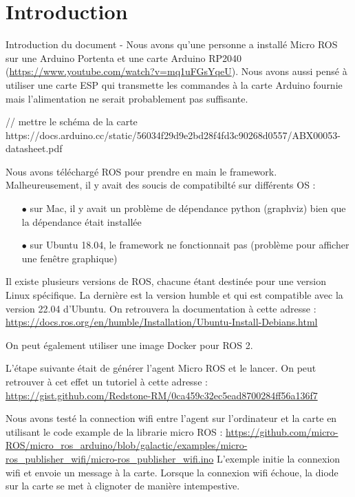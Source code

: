 	\chapter{Introduction}

Introduction du document - 	Nous avons qu'une personne a installé Micro ROS sur une Arduino Portenta et une carte Arduino RP2040 (\url{https://www.youtube.com/watch?v=mq1uFGsYqeU}).
Nous avons aussi pensé à utiliser une carte ESP qui transmette les commandes à la carte Arduino fournie mais l'alimentation ne serait probablement pas suffisante.

// mettre le schéma de la carte
https://docs.arduino.cc/static/56034f29d9e2bd28f4fd3c90268d0557/ABX00053-datasheet.pdf

Nous avons téléchargé ROS pour prendre en main le framework.
Malheureusement, il y avait des soucis de compatibilté sur différents OS :

\begin{itemize}
	\item[$\bullet$] sur Mac, il y avait un problème de dépendance python (graphviz) bien que la dépendance était installée
	\item[$\bullet$]sur Ubuntu 18.04, le framework ne fonctionnait pas (problème pour afficher une fenêtre graphique)
\end{itemize}

Il existe plusieurs versions de ROS, chacune étant destinée pour une version Linux spécifique.
La dernière est la version humble et qui est compatible avec la version 22.04 d'Ubuntu.
On retrouvera la documentation à cette adresse : \url{https://docs.ros.org/en/humble/Installation/Ubuntu-Install-Debians.html}

On peut également utiliser une image Docker pour ROS 2.\linebreak

L'étape suivante était de générer l'agent Micro ROS et le lancer. On peut retrouver à cet effet un tutoriel à cette adresse :
\url{https://gist.github.com/Redstone-RM/0ca459c32ec5ead8700284ff56a136f7}\linebreak

Nous avons testé la connection wifi entre l'agent sur l'ordinateur et la carte en utilisant le code example de la librarie micro ROS :
\url{https://github.com/micro-ROS/micro_ros_arduino/blob/galactic/examples/micro-ros_publisher_wifi/micro-ros_publisher_wifi.ino}
L'exemple initie la connexion wifi et envoie un message à la carte.
Lorsque la connexion wifi échoue, la diode sur la carte se met à clignoter de manière intempestive.\linebreak

